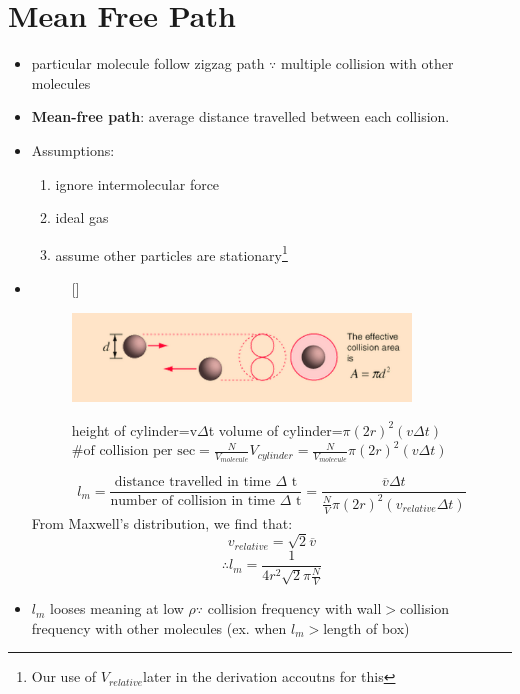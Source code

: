 \documentclass[12 pt, twoside, a4paper] {article}
\begin{document}
\section{Mean Free Path}
\begin{itemize}
\item particular molecule follow zigzag path $\because$ multiple collision with other molecules
\item \textbf{Mean-free path}: average distance travelled between each collision.
\item Assumptions:
\vspace{-10pt}
\begin{enumerate}
\item ignore intermolecular force
\item ideal gas
\item assume other particles are stationary\footnote{Our use of $V_{relative}$later in the derivation accoutns for this}
\end{enumerate}
\item \begin{figure}[h]
\vspace{-10pt}
[\FBwidth]
{\caption{
height of cylinder=v$\Delta$t  \newline
volume of cylinder=$\pi (2r)^2(v\Delta t)$  \newline
$ \text{\# of collision per sec} =\frac{N}{V_{molecule}}V_{cylinder}=\frac{N}{V_{molecule}}\pi (2r)^2(v\Delta t)$
}\label{fig:test}}
{\includegraphics[width=9cm, scale=0.5]{EffectiveArea}}
\end{figure}
\vspace{-10pt}
$$l_m=\frac{\text{distance travelled in time $\Delta$ t}}{\text{number of collision in time $\Delta$ t}}=\frac{\overline{v}\Delta t}{\frac{N}{V}\pi(2r)^2 (v_{relative}\Delta t)}$$
From Maxwell's distribution, we find that: $$v_{relative}=\sqrt{2}\overline{v}$$
\begin{equation}
\therefore l_m=\frac{1}{4r^2\sqrt{2}\pi\frac{N}{V}}
\end{equation} 
\item $l_m$ looses meaning at low $\rho \because$ collision frequency with wall$> $collision frequency with other molecules (ex. when $l_m>$length of box)
\end{itemize}
\end{document}
